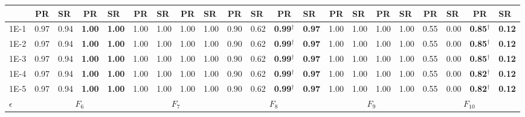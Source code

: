 \begin{table*}[h]
{\begin{tabular}{|p{4.8mm}|p{4.6mm}|p{4.6mm}|p{4.6mm}|p{4.6mm}|p{4.6mm}|p{4.6mm}|p{4.6mm}|p{4.6mm}|p{4.6mm}|p{4.6mm}|p{4.6mm}|p{4.6mm}|p{4.6mm}|p{4.6mm}|p{4.6mm}|p{4.6mm}|p{4.6mm}|p{4.6mm}|p{4.6mm}|p{4.6mm}|}
    \cline{2-21}
     & \multicolumn{1}{c|}{PR} & SR & \multicolumn{1}{c|}{PR} & SR & \multicolumn{1}{c|}{PR} & SR & \multicolumn{1}{c|}{PR} & SR & \multicolumn{1}{c|}{PR} & SR & \multicolumn{1}{c|}{PR} & SR & \multicolumn{1}{c|}{PR} & SR & \multicolumn{1}{c|}{PR} & SR & \multicolumn{1}{c|}{PR} & SR & \multicolumn{1}{c|}{PR} & SR \\
    \hline
    1E-1 & 0.97 & 0.94 & \textcolor{customblue}{\textbf{1.00}} & \textcolor{customblue}{\textbf{1.00}} & 1.00 & 1.00 & 1.00 & 1.00 & 0.90 & 0.62 & \textcolor{customblue}{\textbf{0.99$^\dagger$}} & \textcolor{customblue}{\textbf{0.97}} & 1.00 & 1.00 & 1.00 & 1.00 & 0.55 & 0.00 & \textcolor{customblue}{\textbf{0.85$^\dagger$}} & \textcolor{customblue}{\textbf{0.12}} \\
    1E-2 & 0.97 & 0.94 & \textcolor{customblue}{\textbf{1.00}} & \textcolor{customblue}{\textbf{1.00}} & 1.00 & 1.00 & 1.00 & 1.00 & 0.90 & 0.62 & \textcolor{customblue}{\textbf{0.99$^\dagger$}} & \textcolor{customblue}{\textbf{0.97}} & 1.00 & 1.00 & 1.00 & 1.00 & 0.55 & 0.00 & \textcolor{customblue}{\textbf{0.85$^\dagger$}} & \textcolor{customblue}{\textbf{0.12}} \\
    1E-3 & 0.97 & 0.94 & \textcolor{customblue}{\textbf{1.00}} & \textcolor{customblue}{\textbf{1.00}} & 1.00 & 1.00 & 1.00 & 1.00 & 0.90 & 0.62 & \textcolor{customblue}{\textbf{0.99$^\dagger$}} & \textcolor{customblue}{\textbf{0.97}} & 1.00 & 1.00 & 1.00 & 1.00 & 0.55 & 0.00 & \textcolor{customblue}{\textbf{0.85$^\dagger$}} & \textcolor{customblue}{\textbf{0.12}} \\
    1E-4 & 0.97 & 0.94 & \textcolor{customblue}{\textbf{1.00}} & \textcolor{customblue}{\textbf{1.00}} & 1.00 & 1.00 & 1.00 & 1.00 & 0.90 & 0.62 & \textcolor{customblue}{\textbf{0.99$^\dagger$}} & \textcolor{customblue}{\textbf{0.97}} & 1.00 & 1.00 & 1.00 & 1.00 & 0.55 & 0.00 & \textcolor{customblue}{\textbf{0.82$^\dagger$}} & \textcolor{customblue}{\textbf{0.12}} \\
    1E-5 & 0.97 & 0.94 & \textcolor{customblue}{\textbf{1.00}} & \textcolor{customblue}{\textbf{1.00}} & 1.00 & 1.00 & 1.00 & 1.00 & 0.90 & 0.62 & \textcolor{customblue}{\textbf{0.99$^\dagger$}} & \textcolor{customblue}{\textbf{0.97}} & 1.00 & 1.00 & 1.00 & 1.00 & 0.55 & 0.00 & \textcolor{customblue}{\textbf{0.82$^\dagger$}} & \textcolor{customblue}{\textbf{0.12}} \\
    \hline
    \multirow{3}{*}{$\epsilon$} & \multicolumn{4}{c|}{$F_{6}$} & \multicolumn{4}{c|}{$F_{7}$} & \multicolumn{4}{c|}{$F_{8}$} & \multicolumn{4}{c|}{$F_{9}$} & \multicolumn{4}{c|}{$F_{10}$} \\


\end{tabular}}
\end{table*}
